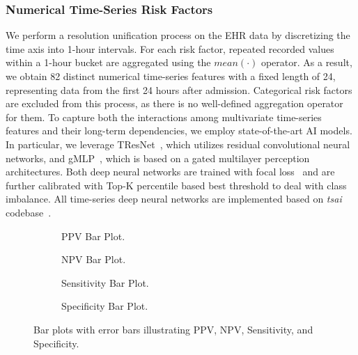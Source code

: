 \subsubsection{Numerical Time-Series Risk Factors} We perform a resolution unification process on the EHR data by discretizing the time axis into 1-hour intervals. For each risk factor, repeated recorded values within a 1-hour bucket are aggregated using the $mean(\cdot)$ operator. As a result, we obtain 82 distinct numerical time-series features with a fixed length of 24, representing data from the first 24 hours after admission. Categorical risk factors are excluded from this process, as there is no well-defined aggregation operator for them. To capture both the interactions among multivariate time-series features and their long-term dependencies, we employ state-of-the-art AI models. In particular, we leverage TResNet~\cite{wang2017TResNet}, which utilizes residual convolutional neural networks, and gMLP~\cite{liu2021gMLP}, which is based on a gated multilayer perception architectures. Both deep neural networks are trained with focal loss~\cite{ross2017focal} and are further calibrated with Top-K percentile based best threshold to deal with class imbalance. All time-series deep neural networks are implemented based on \textit{tsai} codebase~\cite{tsai}.


\begin{figure*}[ht!]
  \begin{subfigure}[b]{0.245\textwidth}
  \centering
  
  \caption{PPV Bar Plot.}
  \label{fig:CHOA-PPV}
  \end{subfigure}
  \hfill
  \begin{subfigure}[b]{0.245\textwidth}
  \centering
  
  \caption{NPV Bar Plot.}
  \label{fig:CHOA-NPV}
  \end{subfigure}
  \hfill
  \begin{subfigure}[b]{0.245\textwidth}
  \centering
  
  \caption{Sensitivity Bar Plot.}
  \label{fig:CHOA-sensitivity}
  \end{subfigure}
  \hfill
  \begin{subfigure}[b]{0.245\textwidth}
  \centering
  
  \caption{Specificity Bar Plot.}
  \label{fig:CHOA-specificity}
  \end{subfigure}
  \caption{Bar plots with error bars illustrating PPV, NPV, Sensitivity, and Specificity.}
  \label{fig:bar_chart}
\end{figure*}


